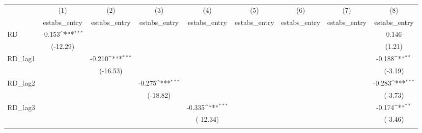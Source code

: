 {
\def\sym#1{\ifmmode^{#1}\else\(^{#1}\)\fi}
\begin{tabular}{l*{8}{c}}
\toprule
            &\multicolumn{1}{c}{(1)}&\multicolumn{1}{c}{(2)}&\multicolumn{1}{c}{(3)}&\multicolumn{1}{c}{(4)}&\multicolumn{1}{c}{(5)}&\multicolumn{1}{c}{(6)}&\multicolumn{1}{c}{(7)}&\multicolumn{1}{c}{(8)}\\
            &\multicolumn{1}{c}{estabs\_entry}&\multicolumn{1}{c}{estabs\_entry}&\multicolumn{1}{c}{estabs\_entry}&\multicolumn{1}{c}{estabs\_entry}&\multicolumn{1}{c}{estabs\_entry}&\multicolumn{1}{c}{estabs\_entry}&\multicolumn{1}{c}{estabs\_entry}&\multicolumn{1}{c}{estabs\_entry}\\
\midrule
RD          &      -0.153\sym{***}&                     &                     &                     &                     &                     &                     &       0.146         \\
            &    (-12.29)         &                     &                     &                     &                     &                     &                     &      (1.21)         \\
\addlinespace
RD\_lag1     &                     &      -0.210\sym{***}&                     &                     &                     &                     &                     &      -0.188\sym{**} \\
            &                     &    (-16.53)         &                     &                     &                     &                     &                     &     (-3.19)         \\
\addlinespace
RD\_lag2     &                     &                     &      -0.275\sym{***}&                     &                     &                     &                     &      -0.283\sym{***}\\
            &                     &                     &    (-18.82)         &                     &                     &                     &                     &     (-3.73)         \\
\addlinespace
RD\_lag3     &                     &                     &                     &      -0.335\sym{***}&                     &                     &                     &      -0.174\sym{**} \\
            &                     &                     &                     &    (-12.34)         &                     &                     &                     &     (-3.46)         \\
\addlinespace

\end{tabular}}
